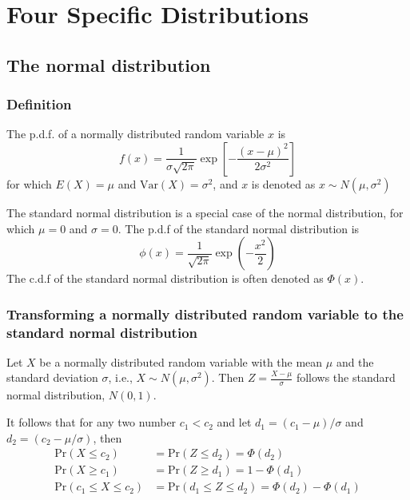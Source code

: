 \documentclass[a4paper,11pt]{article}
\newcommand{\var}{\mathrm{Var}}
\begin{document}
\section{Four Specific Distributions}
\label{sec:org1b1ccc8}
\subsection{The normal distribution}
\label{sec:org294d3eb}
\subsubsection*{Definition}
\label{sec:org36447e3}
The p.d.f. of a normally distributed random variable \(x\) is
\[ f(x) =
\frac{1}{\sigma\sqrt{2\pi}}\exp\left[-\frac{(x-\mu)^{2}}{2\sigma^{2}}\right]
\]
for which \(E(X) = \mu\) and \(\var(X) = \sigma^{2}\), and \(x\) is denoted
as \(x \sim N(\mu, \sigma^{2})\)

The standard normal distribution is a special case of the normal
distribution, for which \(\mu = 0\) and \(\sigma = 0\). The p.d.f of the
standard normal distribution is
\[
\phi(x) = \frac{1}{\sqrt{2\pi}}\exp\left(-\frac{x^2}{2}\right)
\]
The c.d.f of the standard normal distribution is often denoted as
\(\varPhi(x)\).

\subsubsection*{Transforming a normally distributed random variable to the standard normal distribution}
\label{sec:org8b25f8e}
Let \(X\) be a normally distributed random variable with the mean \(\mu\)
and the standard deviation \(\sigma\), i.e., \(X \sim N(\mu,
\sigma^2)\). Then \(Z = \frac{X - \mu}{\sigma}\) follows the standard
normal distribution, \(N(0, 1)\).

It follows that for any two number \(c_1 < c_2\) and let
\(d_1 = (c_1 - \mu)/\sigma\) and \(d_2 = (c_2 - \mu/\sigma)\), then
\begin{align*}
\mathrm{Pr}(X \leq c_2) & = \mathrm{Pr}(Z \leq d_2) = \varPhi(d_2) \\
\mathrm{Pr}(X \geq c_1) & = \mathrm{Pr}(Z \geq d_1) = 1 - \varPhi(d_1) \\
\mathrm{Pr}(c_1 \leq X \leq c_2) & = \mathrm{Pr}(d_1 \leq Z \leq d_2) = \varPhi(d_2) - \varPhi(d_1)
\end{align*}
\end{document}
